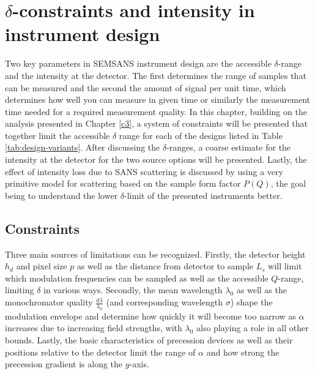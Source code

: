 \documentclass{article}
\begin{document}

\newpage
\section{$\delta$-constraints and intensity in instrument design}
\label{c4:constraints}
Two key parameters in SEMSANS instrument design are the accessible $\delta$-range and the intensity at the detector. The first determines the range of samples that can be measured and the second the amount of signal per unit time, which determines how well you can measure in given time or similarly the measurement time needed for a required measurement quality. In this chapter, building on the analysis presented in Chapter \ref{c3}, a system of constraints will be presented that together limit the accessible $\delta$ range for each of the designs listed in Table \ref{tab:design-variants}. After discussing the $\delta$-ranges, a coarse estimate for the intensity at the detector for the two source options will be presented. Lastly, the effect of intensity loss due to SANS scattering is discussed by using a very primitive model for scattering based on the sample form factor $P(Q)$, the goal being to understand the lower $\delta$-limit of the presented instruments better.
\subsection{Constraints}
\label{c4.1}
Three main sources of limitations can be recognized. Firstly, the detector height $h_d$ and pixel size $p$ as well as the distance from detector to sample $L_s$ will limit which modulation frequencies can be sampled as well as the accessible $Q$-range, limiting $\delta$ in various ways.
Secondly, the mean wavelength $\lambda_0$ as well as the monochromator quality $\frac{d\lambda}{\lambda_0}$ (and corresponding wavelength $\sigma$) shape the modulation envelope and determine how quickly it will become too narrow as $\alpha$ increases due to increasing field strengths, with $\lambda_0$ also playing a role in all other bounds. Lastly, the basic characteristics of precession devices as well as their positions relative to the detector limit the range of $\alpha$ and how strong the precession gradient is along the $y$-axis. 
\end{document}

